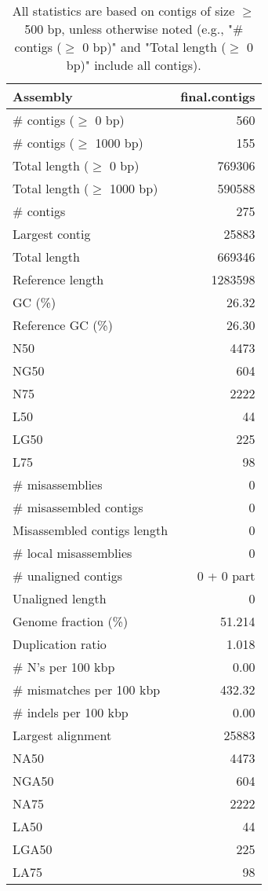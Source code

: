 \documentclass[12pt,a4paper]{article}
\begin{document}
\begin{table}[ht]
\begin{center}
\caption{All statistics are based on contigs of size $\geq$ 500 bp, unless otherwise noted (e.g., "\# contigs ($\geq$ 0 bp)" and "Total length ($\geq$ 0 bp)" include all contigs).}
\begin{tabular}{|l*{1}{|r}|}
\hline
Assembly & final.contigs \\ \hline
\# contigs ($\geq$ 0 bp) & 560 \\ \hline
\# contigs ($\geq$ 1000 bp) & 155 \\ \hline
Total length ($\geq$ 0 bp) & 769306 \\ \hline
Total length ($\geq$ 1000 bp) & 590588 \\ \hline
\# contigs & 275 \\ \hline
Largest contig & 25883 \\ \hline
Total length & 669346 \\ \hline
Reference length & 1283598 \\ \hline
GC (\%) & 26.32 \\ \hline
Reference GC (\%) & 26.30 \\ \hline
N50 & 4473 \\ \hline
NG50 & 604 \\ \hline
N75 & 2222 \\ \hline
L50 & 44 \\ \hline
LG50 & 225 \\ \hline
L75 & 98 \\ \hline
\# misassemblies & 0 \\ \hline
\# misassembled contigs & 0 \\ \hline
Misassembled contigs length & 0 \\ \hline
\# local misassemblies & 0 \\ \hline
\# unaligned contigs & 0 + 0 part \\ \hline
Unaligned length & 0 \\ \hline
Genome fraction (\%) & 51.214 \\ \hline
Duplication ratio & 1.018 \\ \hline
\# N's per 100 kbp & 0.00 \\ \hline
\# mismatches per 100 kbp & 432.32 \\ \hline
\# indels per 100 kbp & 0.00 \\ \hline
Largest alignment & 25883 \\ \hline
NA50 & 4473 \\ \hline
NGA50 & 604 \\ \hline
NA75 & 2222 \\ \hline
LA50 & 44 \\ \hline
LGA50 & 225 \\ \hline
LA75 & 98 \\ \hline
\end{tabular}
\end{center}
\end{table}
\end{document}
